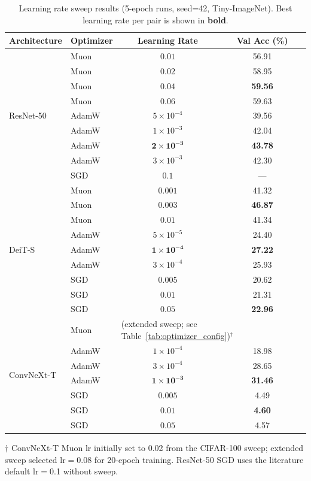 \begin{table}[h]
\centering
\caption{Learning rate sweep results (5-epoch runs, seed=42, Tiny-ImageNet). Best learning rate per pair is shown in \textbf{bold}.}
\label{tab:lr_sweep_tinyin}
\small
\begin{tabular}{llcc}
\toprule
Architecture & Optimizer & Learning Rate & Val Acc (\%) \\
\midrule
\multirow{9}{*}{ResNet-50}
 & Muon & $0.01$ & 56.91 \\
 & Muon & $0.02$ & 58.95 \\
 & Muon & $\mathbf{0.04}$ & \textbf{59.56} \\
 & Muon & $0.06$ & 59.63 \\
\cmidrule(lr){2-4}
 & AdamW & $5 \times 10^{-4}$ & 39.56 \\
 & AdamW & $1 \times 10^{-3}$ & 42.04 \\
 & AdamW & $\mathbf{2 \times 10^{-3}}$ & \textbf{43.78} \\
 & AdamW & $3 \times 10^{-3}$ & 42.30 \\
\cmidrule(lr){2-4}
 & SGD & $\mathbf{0.1}$ & --- \\
\midrule
\multirow{9}{*}{DeiT-S}
 & Muon & $0.001$ & 41.32 \\
 & Muon & $\mathbf{0.003}$ & \textbf{46.87} \\
 & Muon & $0.01$ & 41.34 \\
\cmidrule(lr){2-4}
 & AdamW & $5 \times 10^{-5}$ & 24.40 \\
 & AdamW & $\mathbf{1 \times 10^{-4}}$ & \textbf{27.22} \\
 & AdamW & $3 \times 10^{-4}$ & 25.93 \\
\cmidrule(lr){2-4}
 & SGD & $0.005$ & 20.62 \\
 & SGD & $0.01$ & 21.31 \\
 & SGD & $\mathbf{0.05}$ & \textbf{22.96} \\
\midrule
\multirow{7}{*}{ConvNeXt-T}
 & Muon & \multicolumn{2}{l}{(extended sweep; see Table~\ref{tab:optimizer_config})$^\dagger$} \\
\cmidrule(lr){2-4}
 & AdamW & $1 \times 10^{-4}$ & 18.98 \\
 & AdamW & $3 \times 10^{-4}$ & 28.65 \\
 & AdamW & $\mathbf{1 \times 10^{-3}}$ & \textbf{31.46} \\
\cmidrule(lr){2-4}
 & SGD & $0.005$ & 4.49 \\
 & SGD & $\mathbf{0.01}$ & \textbf{4.60} \\
 & SGD & $0.05$ & 4.57 \\
\bottomrule
\end{tabular}
\vspace{0.3em}
\par\noindent\footnotesize{$\dagger$ ConvNeXt-T Muon lr initially set to 0.02 from the CIFAR-100 sweep; extended sweep selected lr$=$0.08 for 20-epoch training. ResNet-50 SGD uses the literature default lr$=$0.1 without sweep.}
\end{table}

